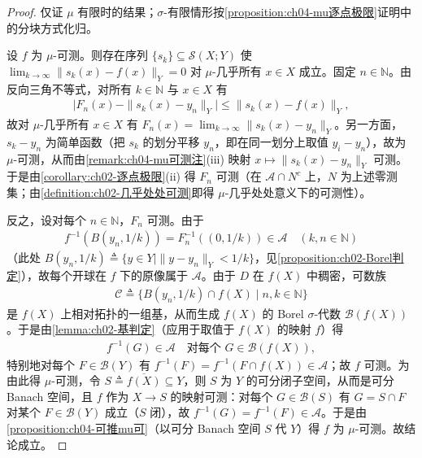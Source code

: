 \documentclass[../../main.tex]{subfiles}%
\begin{document}
\begin{proof}
仅证 $\mu$ 有限时的结果；$\sigma$-有限情形按\cref{proposition:ch04-mu逐点极限}证明中的分块方式化归。

设 $f$ 为 $\mu$-可测。则存在序列 $\{s_k\}\subseteq\mathcal{S}(X;Y)$ 使 $\lim_{k\to\infty}\|s_k(x)-f(x)\|_Y=0$ 对 $\mu$-几乎所有 $x\in X$ 成立。固定 $n\in\mathbb{N}$。由反向三角不等式，对所有 $k\in\mathbb{N}$ 与 $x\in X$ 有
\begin{align*}
\big|F_n(x)-\|s_k(x)-y_n\|_Y\big|\leqslant\|s_k(x)-f(x)\|_Y,
\end{align*}
故对 $\mu$-几乎所有 $x\in X$ 有 $F_n(x)=\lim_{k\to\infty}\|s_k(x)-y_n\|_Y$。另一方面，$s_k-y_n$ 为简单函数（把 $s_k$ 的划分平移 $y_n$，即在同一划分上取值 $y_i-y_n$），故为 $\mu$-可测，从而由\cref{remark:ch04-mu可测注}(iii) 映射 $x\mapsto\|s_k(x)-y_n\|_Y$ 可测。于是由\cref{corollary:ch02-逐点极限}(ii) 得 $F_n$ 可测（在 $\mathcal{A}\cap N^c$ 上，$N$ 为上述零测集；由\cref{definition:ch02-几乎处处可测}即得 $\mu$-几乎处处意义下的可测性）。

反之，设对每个 $n\in\mathbb{N}$，$F_n$ 可测。由于
\begin{align*}
f^{-1}(B(y_n,1/k))=F_n^{-1}((0,1/k))\in\mathcal{A}\quad(k,n\in\mathbb{N})
\end{align*}
（此处 $B(y_n,1/k)\triangleq \{y\in Y\mid\|y-y_n\|_Y<1/k\}$，见\cref{proposition:ch02-Borel判定}），故每个开球在 $f$ 下的原像属于 $\mathcal{A}$。由于 $D$ 在 $f(X)$ 中稠密，可数族
\begin{align*}
\mathcal{C}\triangleq\{B(y_n,1/k)\cap f(X)\mid n,k\in\mathbb{N}\}
\end{align*}
是 $f(X)$ 上相对拓扑的一组基，从而生成 $f(X)$ 的 Borel $\sigma$-代数 $\mathcal{B}(f(X))$。于是由\cref{lemma:ch02-基判定}（应用于取值于 $f(X)$ 的映射 $f$）得
\begin{align*}
f^{-1}(G)\in\mathcal{A}\quad\text{对每个 }G\in\mathcal{B}(f(X)),
\end{align*}
特别地对每个 $F\in\mathcal{B}(Y)$ 有 $f^{-1}(F)=f^{-1}(F\cap f(X))\in\mathcal{A}$；故 $f$ 可测。为由此得 $\mu$-可测，令 $S\triangleq\overline{f(X)}\subseteq Y$，则 $S$ 为 $Y$ 的可分闭子空间，从而是可分 Banach 空间，且 $f$ 作为 $X\to S$ 的映射可测：对每个 $G\in\mathcal{B}(S)$ 有 $G=S\cap F$ 对某个 $F\in\mathcal{B}(Y)$ 成立（$S$ 闭），故 $f^{-1}(G)=f^{-1}(F)\in\mathcal{A}$。于是由\cref{proposition:ch04-可推mu可}（以可分 Banach 空间 $S$ 代 $Y$）得 $f$ 为 $\mu$-可测。故结论成立。
\end{proof}
\end{document}
